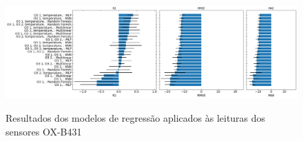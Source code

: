 \begin{figure}[h!]
    \centering
    \caption{Resultados dos modelos de regressão aplicados às leituras dos sensores OX-B431}
    \includegraphics[width=\textwidth]{chapters/4-CALIBRAÇÃO MÚLTIPLOS SENSORES/Figuras/o3-b4-models-performance.png}
    \label{fig:data-o3-b4-models-performance}
\end{figure}

